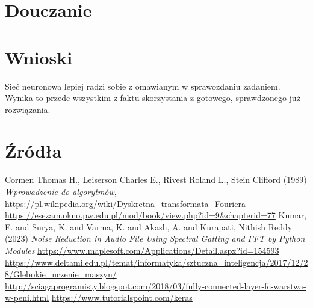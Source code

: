 \documentclass[polish]{article}
\begin{document}
\section{Douczanie}

\section{Wnioski}
Sieć neuronowa lepiej radzi sobie z omawianym w sprawozdaniu zadaniem. Wynika to przede wszystkim z faktu skorzystania z gotowego, sprawdzonego już rozwiązania.
\section{Źródła}
\begin{thebibliography}{2}
 Cormen Thomas H., Leiserson Charles E., Rivest Roland L., Stein Clifford (1989) \emph{Wprowadzenie do algorytmów},
\url{https://pl.wikipedia.org/wiki/Dyskretna_transformata_Fouriera}
\url{https://esezam.okno.pw.edu.pl/mod/book/view.php?id=9&chapterid=77}
Kumar, E. and Surya, K. and Varma, K. and Akash, A. and Kurapati, Nithish Reddy (2023) \emph{Noise Reduction in Audio File Using Spectral Gatting and FFT by Python Modules}
\url{https://www.maplesoft.com/Applications/Detail.aspx?id=154593}
\url{https://www.deltami.edu.pl/temat/informatyka/sztuczna_inteligencja/2017/12/28/Glebokie_uczenie_maszyn/}
\url{http://sciagaprogramisty.blogspot.com/2018/03/fully-connected-layer-fc-warstwa-w-peni.html}
\url{https://www.tutorialspoint.com/keras}
\end{thebibliography}
\end{document}
